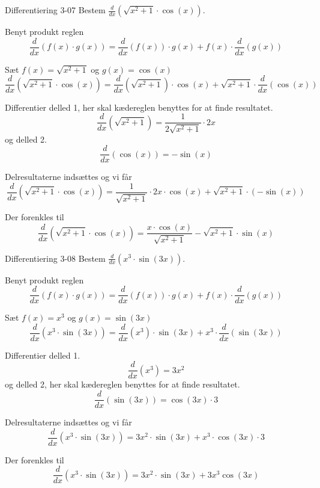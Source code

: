 \documentclass{article}
\begin{document}
\begin{exercise}{Differentiering 3-07}
Bestem $\frac{d}{dx} \left( \sqrt{x^2 + 1} \cdot \cos(x) \right)$.


\hint
Benyt produkt reglen
\[
\frac{d}{dx} \left( f(x) \cdot g(x) \right) = \frac{d}{dx} \left( f(x) \right) \cdot g(x) + f(x) \cdot \frac{d}{dx} \left( g(x) \right)
\]

\hint
Sæt $f(x) = \sqrt{x^2 + 1}$ og $g(x) = \cos(x)$
\[
\frac{d}{dx} \left( \sqrt{x^2 + 1} \cdot \cos(x) \right) = \frac{d}{dx} \left( \sqrt{x^2 + 1}\right) \cdot \cos(x) + \sqrt{x^2 + 1} \cdot \frac{d}{dx} \left( \cos(x) \right)
\]

\hint
Differentier delled 1, her skal kædereglen benyttes for at finde resultatet.
\[
\frac{d}{dx} \left( \sqrt{x^2 + 1 }\right) = \frac{1}{2 \sqrt{x^2 + 1}} \cdot 2x
\]
og delled 2.
\[
\frac{d}{dx} \left( \cos(x) \right) = - \sin(x)
\]


\hint
Delresultaterne indsættes og vi får
\[
\frac{d}{dx} \left( \sqrt{x^2 + 1} \cdot \cos(x) \right) = \frac{1}{\sqrt{x^2 + 1}} \cdot 2x \cdot \cos(x) + \sqrt{x^2 + 1} \cdot (- \sin(x))
\]

\hint
Der forenkles til
\[
\frac{d}{dx} \left( \sqrt{x^2 + 1} \cdot \cos(x)\right) = \frac{x \cdot \cos(x)}{\sqrt{x^2 + 1}} - \sqrt{x^2 + 1 } \cdot \sin(x)
\]

\end{exercise}


\begin{exercise}{Differentiering 3-08}
Bestem $\frac{d}{dx} \left( x^3 \cdot \sin(3x) \right)$.


\hint
Benyt produkt reglen
\[
\frac{d}{dx} \left( f(x) \cdot g(x) \right) = \frac{d}{dx} \left( f(x) \right) \cdot g(x) + f(x) \cdot \frac{d}{dx} \left( g(x) \right)
\]

\hint
Sæt $f(x) = x^3$ og $g(x) = \sin(3x)$
\[
\frac{d}{dx} \left( x^3 \cdot \sin(3x) \right) = \frac{d}{dx} \left( x^3 \right) \cdot \sin(3x) + x^3 \cdot \frac{d}{dx} \left( \sin(3x)\right)
\]

\hint
Differentier delled 1.
\[
\frac{d}{dx} \left( x^3 \right) = 3x^2
\]
og delled 2, her skal kædereglen benyttes for at finde resultatet.
\[
\frac{d}{dx} \left( \sin(3x) \right) = \cos(3x) \cdot 3
\]


\hint
Delresultaterne indsættes og vi får
\[
\frac{d}{dx} \left( x^3 \cdot \sin(3x) \right) = 3x^2 \cdot \sin(3x) + x^3 \cdot \cos(3x) \cdot 3
\]

\hint
Der forenkles til
\[
\frac{d}{dx} \left( x^3 \cdot \sin(3x) \right) = 3x^2 \cdot \sin(3x) + 3x^3 \cos(3x)
\]

\end{exercise}
\end{document}
